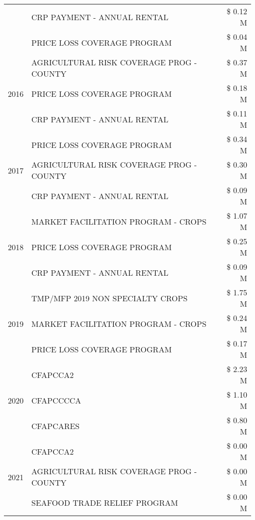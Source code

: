 \begin{tabular}{llr}
 & CRP PAYMENT - ANNUAL RENTAL & \$ 0.12 M \\
 & PRICE LOSS COVERAGE PROGRAM & \$ 0.04 M \\
\cline{1-3}
\multirow[t]{3}{*}{2016} & AGRICULTURAL RISK COVERAGE PROG - COUNTY & \$ 0.37 M \\
 & PRICE LOSS COVERAGE PROGRAM & \$ 0.18 M \\
 & CRP PAYMENT - ANNUAL RENTAL & \$ 0.11 M \\
\cline{1-3}
\multirow[t]{3}{*}{2017} & PRICE LOSS COVERAGE PROGRAM & \$ 0.34 M \\
 & AGRICULTURAL RISK COVERAGE PROG - COUNTY & \$ 0.30 M \\
 & CRP PAYMENT - ANNUAL RENTAL & \$ 0.09 M \\
\cline{1-3}
\multirow[t]{3}{*}{2018} & MARKET FACILITATION PROGRAM - CROPS & \$ 1.07 M \\
 & PRICE LOSS COVERAGE PROGRAM & \$ 0.25 M \\
 & CRP PAYMENT - ANNUAL RENTAL & \$ 0.09 M \\
\cline{1-3}
\multirow[t]{3}{*}{2019} & TMP/MFP 2019 NON SPECIALTY CROPS & \$ 1.75 M \\
 & MARKET FACILITATION PROGRAM - CROPS & \$ 0.24 M \\
 & PRICE LOSS COVERAGE PROGRAM & \$ 0.17 M \\
\cline{1-3}
\multirow[t]{3}{*}{2020} & CFAPCCA2 & \$ 2.23 M \\
 & CFAPCCCCA & \$ 1.10 M \\
 & CFAPCARES & \$ 0.80 M \\
\cline{1-3}
\multirow[t]{3}{*}{2021} & CFAPCCA2 & \$ 0.00 M \\
 & AGRICULTURAL RISK COVERAGE PROG - COUNTY & \$ 0.00 M \\
 & SEAFOOD TRADE RELIEF PROGRAM & \$ 0.00 M \\
\cline{1-3}
\bottomrule
\end{tabular}
